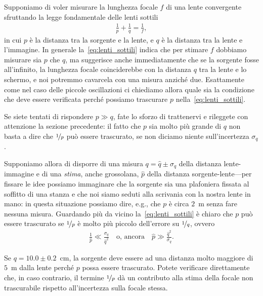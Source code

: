Supponiamo di voler misurare la lunghezza focale $f$ di una lente convergente
sfruttando la legge fondamentale delle lenti sottili
\begin{align}\label{eq:lenti_sottili}
  \frac{1}{p} + \frac{1}{q} = \frac{1}{f},
\end{align}
in cui $p$ è la distanza tra la sorgente e la lente, e $q$ è la distanza
tra la lente e l'immagine. In generale la~\eqref{eq:lenti_sottili} indica
che per stimare $f$ dobbiamo misurare sia $p$ che $q$, ma suggerisce anche
immediatamente che se la sorgente fosse all'infinito, la lunghezza focale
coinciderebbe con la distanza $q$ tra la lente e lo schermo, e noi potremmo
cavarcela con una misura anziché due. Esattamente come nel caso delle piccole
oscillazioni ci chiediamo allora quale sia la condizione che deve essere
verificata perché possiamo trascurare $p$
nella~\eqref{eq:lenti_sottili}.

Se siete tentati di rispondere $p \gg q$, fate lo sforzo di trattenervi e
rileggete con attenzione la sezione precedente: il fatto che $p$ sia molto
più grande di $q$ non basta a dire che $\nicefrac{1}{p}$ può essere
trascurato, se non diciamo niente sull'incertezza $\sigma_q$.

Supponiamo allora di disporre di una misura $q = \hat{q} \pm \sigma_q$ della
distanza lente-immagine e di una \emph{stima}, anche grossolana, $\hat{p}$
della distanza sorgente-lente---per fissare le idee possiamo immaginare
che la sorgente sia una plafoniera fissata al soffitto di una stanza e che noi
siamo seduti alla scrivania con la nostra lente in mano: in questa situazione
possiamo dire, e.g., che $p$ è circa $2$~m senza fare nessuna misura.
Guardando più da vicino la~\eqref{eq:lenti_sottili} è chiaro che $p$ può
essere trascurato se $\nicefrac{1}{p}$ è molto più piccolo dell'errore su
$\nicefrac{1}{q}$, ovvero
\begin{align}
  \frac{1}{\hat{p}} \ll \frac{\sigma_q}{\hat{q}^2}
  \quad \text{o, ancora} \quad
  \hat{p} \gg \frac{\hat{q}^2}{\sigma_q}.
\end{align}

\begin{examplebox}
  \begin{example}
    Se $q = 10.0 \pm 0.2$~cm, la sorgente deve essere ad una distanza molto
    maggiore di $5$~m dalla lente perché $p$ possa essere trascurato. Potete
    verificare direttamente che, in caso contrario, il termine $\nicefrac{1}{p}$
    dà un contributo alla stima della focale non trascurabile rispetto
    all'incertezza sulla focale stessa.
  \end{example}
\end{examplebox}


